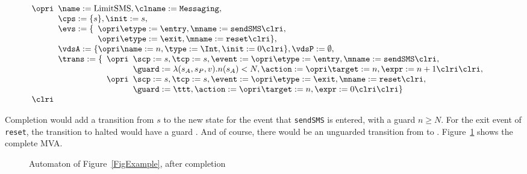 \[
\begin{array}[t]{l}
\opri 
\begin{array}[t]{l}
\name := \textrm{LimitSMS}, \clname := \texttt{Messaging},\\
\cps := \{s\},
\init := s,\\
\evs := \{
\begin{array}[t]{l}
\opri \etype := \entry, \mname := \texttt{sendSMS} \clri,\\
\opri \etype := \exit, \mname := \texttt{reset} \clri\},
\end{array}
\\
\vdsA := \{\opri \name := n, \type := \Int, \init := 0 \clri\},
\vdsP := \emptyset,\\
\trans := \{
\begin{array}[t]{l}
\opri 
 \begin{array}[t]{l}
\scp := s, \tcp := s, 
             \event := \opri \etype := \entry, 
                             \mname := \texttt{sendSMS} \clri, \\
             \guard := \lambda(s_A, s_P, v). n(s_A) < N,
             \action := \opri \target := n, \expr := n + 1 \clri 
            \clri,
\end{array}\\
\opri 
\begin{array}[t]{l}
\scp := s, \tcp := s,
             \event := \opri \etype := \exit, \mname := \texttt{reset}
\clri, \\
             \guard := \ttt, 
             \action := \opri \target := n, \expr := 0 \clri
           \clri \}
\end{array}
\end{array}
\end{array}\\
\clri
\end{array}
\]

Completion would add a transition from \(s\) to the new state \halted
for the event that \texttt{sendSMS} is entered, with a guard \(n \geq
N\). For the exit event of \texttt{reset}, the transition to halted
would have a guard \fff. And of course, there would be an unguarded
transition from \halted to \halted. Figure~\ref{FigCompleteMVA} shows
the complete MVA. 
 
\begin{figure}[t]
\begin{center}
\end{center}
\label{FigCompleteMVA}
\caption{Automaton of Figure~\ref{FigExample}, after completion}
\end{figure}
